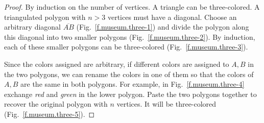 \begin{proof}
By induction on the number of vertices. A triangle can be three-colored. A triangulated polygon with $n>3$ vertices must have a diagonal. Choose an arbitrary diagonal $\overline{AB}$ (Fig.~\ref{f.museum.three-1}) and divide the polygon along this diagonal into two smaller polygons (Fig.~\ref{f.museum.three-2}). By induction, each of these smaller polygons can be three-colored (Fig.~\ref{f.museum.three-3}).

Since the colors assigned are arbitrary, if different colors are assigned to $A,B$ in the two polygons, we can rename the colors in one of them so that the colors of $A,B$ are the same in both polygons. For example, in Fig.~\ref{f.museum.three-4} exchange \emph{red} and \emph{green} in the lower polygon.
Paste the two polygons together to recover the original polygon with $n$ vertices. It will be three-colored (Fig.~\ref{f.museum.three-5}).
\end{proof}

